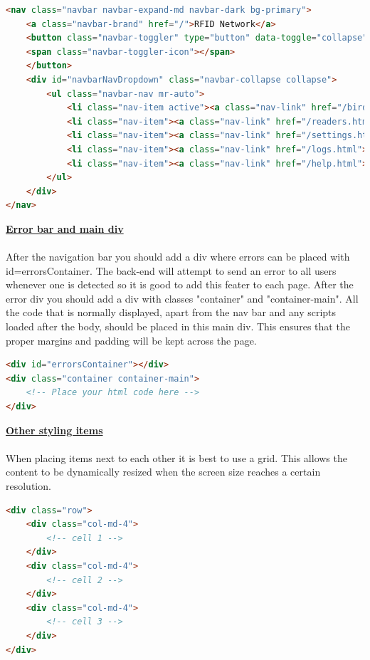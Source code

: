 \documentclass[12pt]{article}
\begin{document}
\begin{lstlisting}[language=html, caption="Navigation bar style", breaklines=true]
<nav class="navbar navbar-expand-md navbar-dark bg-primary">
	<a class="navbar-brand" href="/">RFID Network</a>
	<button class="navbar-toggler" type="button" data-toggle="collapse" data-target="#navbarNavDropdown" aria-controls="navbarNavDropdown" aria-expanded="false" aria-label="Toggle navigation">
	<span class="navbar-toggler-icon"></span>
	</button>
	<div id="navbarNavDropdown" class="navbar-collapse collapse">
		<ul class="navbar-nav mr-auto">
			<li class="nav-item active"><a class="nav-link" href="/birds.html">Birds</a></li>
			<li class="nav-item"><a class="nav-link" href="/readers.html">Reader</a></li>
			<li class="nav-item"><a class="nav-link" href="/settings.html">Settings</a></li>
			<li class="nav-item"><a class="nav-link" href="/logs.html">Logs</a></li>
			<li class="nav-item"><a class="nav-link" href="/help.html">Help</a></li>
		</ul>
	</div>
</nav>
\end{lstlisting}


\underline{\textbf{Error bar and main div}}\\\\
After the navigation bar you should add a div where errors can be placed with id=errorsContainer.  The back-end will attempt to send an error to all users whenever one is detected so it is good to add this feater to each page.  After the error div you should add a div with classes "container" and "container-main".  All the code that is normally displayed, apart from the nav bar and any scripts loaded after the body, should be placed in this main div.  This ensures that the proper margins and padding will be kept across the page.

\begin{lstlisting}[language=html, caption="Error bar and main div", breaklines=true]
<div id="errorsContainer"></div>
<div class="container container-main">
	<!-- Place your html code here -->
</div>
\end{lstlisting}

\underline{\textbf{Other styling items}}\\\\
When placing items next to each other it is best to use a grid.  This allows the content to be dynamically resized when the screen size reaches a certain resolution.  
\begin{lstlisting}[language=html, caption="Bootstrap grid", breaklines=true]
<div class="row">
	<div class="col-md-4">
		<!-- cell 1 -->
	</div>
	<div class="col-md-4">
		<!-- cell 2 -->
	</div>
	<div class="col-md-4">
		<!-- cell 3 -->
	</div>
</div>
\end{lstlisting}
\end{document}
